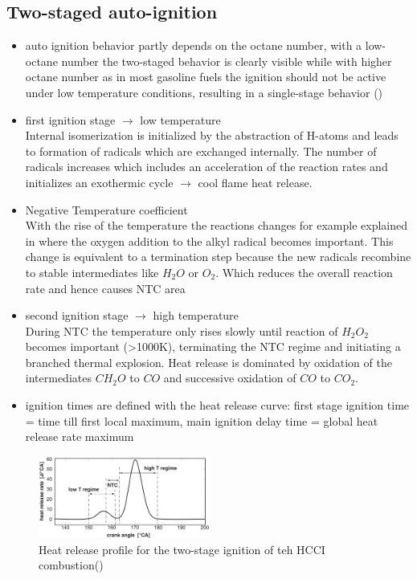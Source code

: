 \documentclass[12pt,oneside,a4paper,english]{article}
\begin{document}
\subsection{Two-staged auto-ignition} %
\begin{itemize}
\item{auto ignition behavior partly depends on the octane number, with a low-octane number the two-staged behavior is clearly visible while with higher octane number as in most gasoline fuels the ignition should not be active under low temperature conditions, resulting in a single-stage behavior (\cite{Chung2015})}
\item{first ignition stage $\rightarrow$ low temperature\\
Internal isomerization is initialized by the abstraction of H-atoms and leads to formation of radicals which are exchanged internally. The number of radicals increases which includes an acceleration of the reaction rates and initializes an exothermic cycle $\rightarrow$ cool flame heat release. }
\item{Negative Temperature coefficient\\
With the rise of the temperature the reactions changes for example explained in \cite{vandersickel2013} where the oxygen addition to the alkyl radical becomes important. This change is equivalent to a termination step because the new radicals recombine to stable intermediates like $H_2O$ or $O_2$. Which reduces the overall reaction rate and hence causes NTC area}
\item{second ignition stage $\rightarrow$ high temperature\\
During NTC the temperature only rises slowly until reaction of $H_2O_2$ becomes important (>1000K), terminating the NTC regime and initiating a branched thermal explosion. Heat release is dominated by oxidation of the intermediates $CH_2O$ to $CO$ and successive oxidation of $CO$ to $CO_2$. } 
\item{ignition times are defined with the heat release curve: first stage ignition time = time till first local maximum, main ignition delay time = global heat release rate maximum}\\
\end{itemize}

\begin{figure}[H]
\centering
\includegraphics[width=0.5\textwidth]{two-stage-ignition}
\caption{Heat release profile for the two-stage ignition of teh HCCI combustion(\cite{vandersickel2013})}
\label{fig:two-stage-ignition}
\end{figure}
\end{document}
